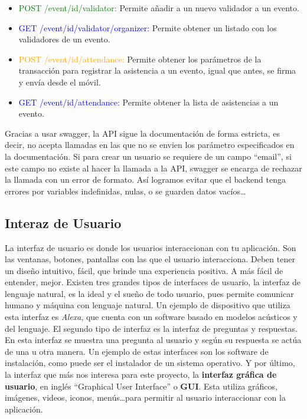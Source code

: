 \begin{itemize}
\item \textcolor{green}{{\footnotesize POST} /event/{id}/validator:} Permite añadir a un nuevo validador a un evento.
\item \textcolor{blue}{{\footnotesize GET} /event/{id}/validator/{organizer}:} Permite obtener un listado con los validadores de un evento. 
\item \textcolor{orange}{{\footnotesize POST} /event/{id}/attendance:} Permite obtener los parámetros de la transacción para registrar la asistencia a un evento, igual que antes, se firma y envía desde el móvil. 
\item \textcolor{blue}{{\footnotesize GET} /event/{id}/attendance:} Permite obtener la lista de asistencias a un evento. 
\end{itemize}

Gracias a usar swagger, la API sigue la documentación de forma estricta, es decir, no acepta llamadas en las que no se envien los parámetro especificados en la documentación. Si para crear un usuario se requiere de un campo ``email'', si este campo no existe al hacer la llamada a la API, swagger se encarga de rechazar la llamada con un error de formato. Así logramos evitar que el backend tenga errores por variables indefinidas, nulas, o se guarden datos vacíos\dots

\subsection{Interaz de Usuario}

La interfaz de usuario es donde los usuarios interaccionan con tu aplicación. Son las ventanas, botones, pantallas con las que el usuario interacciona. Deben tener un diseño intuitivo, fácil, que brinde una experiencia positiva. A más fácil de entender, mejor. Existen tres grandes tipos de interfaces de usuario, la interfaz de lenguaje natural, es la ideal y el sueño de todo usuario, pues permite comunicar humano y máquina con lenguaje natural. Un ejemplo de dispositivo que utiliza esta interfaz es \emph{Alexa}, que cuenta con un software basado en modelos acústicos y del lenguaje. El segundo tipo de interfaz es la interfaz de preguntas y respuestas. En esta interfaz se muestra una pregunta al usuario y según su respuesta se actúa de una u otra manera. Un ejemplo de estas interfaces son los software de instalación, como puede ser el instalador de un sistema operativo. Y por último, la interfaz que más nos interesa para este proyecto, la \textbf{interfaz gráfica de usuario}, en inglés ``Graphical User Interface'' o \textbf{GUI}. Esta utiliza gráficos, imágenes, videos, iconos, menús\dots para permitir al usuario interaccionar con la aplicación. 


